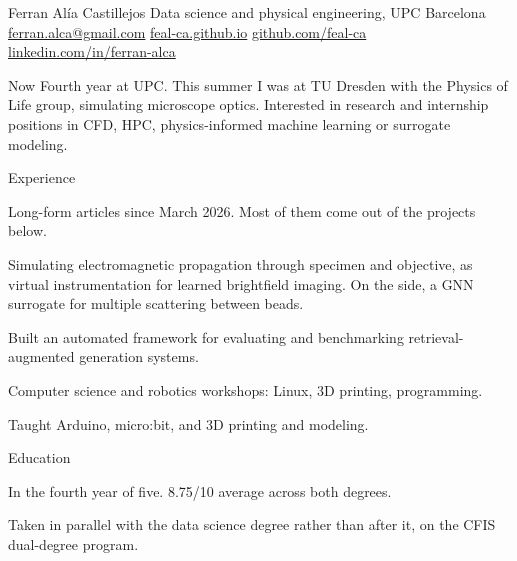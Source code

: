 \documentclass[10pt,a4paper]{article}
\begin{document}
\cvheader
  {Ferran Alía Castillejos}
  {Data science and physical engineering, UPC Barcelona}
  {%
    \href{mailto:ferran.alca@gmail.com}{ferran.alca@gmail.com}%
    \cvdot
    \href{https://feal-ca.github.io}{feal-ca.github.io}%
    \cvdot
    \href{https://github.com/feal-ca}{github.com/feal-ca}%
    \cvdot
    \href{https://www.linkedin.com/in/ferran-alca/}{linkedin.com/in/ferran-alca}%
  }

\begin{cvsection}{Now}
Fourth year at UPC. This summer I was at TU Dresden with the Physics of
Life group, simulating microscope optics. Interested in research and
internship positions in CFD, HPC, physics-informed machine learning or
surrogate modeling.
\end{cvsection}

\begin{cvsection}{Experience}

  {Long-form articles since March 2026. Most of them come out of the
   projects below.}

  {Simulating electromagnetic propagation through specimen and objective, as
   virtual instrumentation for learned brightfield imaging. On the side, a
   GNN surrogate for multiple scattering between beads.}

  {Built an automated framework for evaluating and benchmarking
   retrieval-augmented generation systems.}

  {Computer science and robotics workshops: Linux, 3D printing, programming.}

  {Taught Arduino, micro:bit, and 3D printing and modeling.}

\end{cvsection}

\begin{cvsection}{Education}

  {In the fourth year of five. 8.75/10 average across both degrees.}

  {Taken in parallel with the data science degree rather than after it, on
   the CFIS dual-degree program.}

\end{cvsection}
\end{document}
